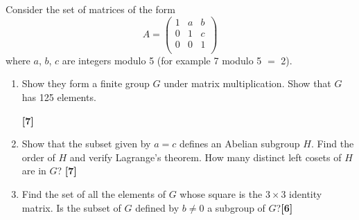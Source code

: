 \documentclass[a4paper]{article}
\begin{document}
\begin{ans}
\begin{enumerate}[label=(\alph*)]
\end{enumerate}
\end{ans}
\newpage
\begin{qns}
Consider the set of matrices of the form
$$A=\begin{pmatrix}1&a&b\\0&1&c\\0&0&1\\\end{pmatrix}$$
where $a$, $b$, $c$ are integers modulo 5 (for example 7 modulo 5 $=$ 2).
\begin{enumerate}[label=(\alph*)]
\item Show they form a finite group $G$ under matrix multiplication. Show that $G$ has 125 elements.

\hfill\textbf{[7]}
\item Show that the subset given by $a = c$ defines an Abelian subgroup $H$. Find the order of $H$ and verify Lagrange’s theorem. How many distinct left cosets of $H$ are in $G$?
\hfill\textbf{[7]}
\item Find the set of all the elements of $G$ whose square is the $3\times 3$ identity matrix. Is the subset of $G$ defined by $b\neq 0$ a subgroup of $G$?\hfill\textbf{[6]}
\end{enumerate}
\end{qns}
\end{document}
